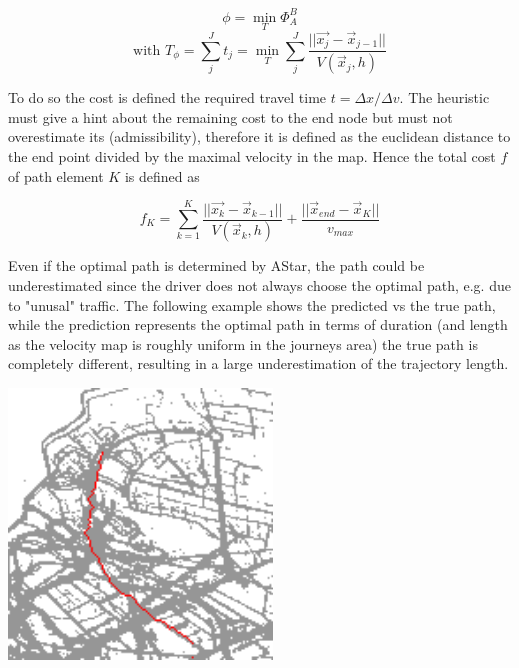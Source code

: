 \documentclass{article}
\newenvironment{Figure}
{\par\medskip\noindent\minipage{\linewidth}}
{\endminipage\par\medskip}
\begin{document}
\begin{multicols}{2}
$$\phi = \min_{T} \Phi_A^B$$
$$\text{with } T_{\phi} = \sum_j^J t_j = \min_{T} \sum_j^J \frac{||\vec{x_j} - \vec{x}_{j-1}||}{V(\vec{x}_j, h)}$$

To do so the cost is defined the required travel time $t = \Delta x / \Delta v$. The heuristic must give a hint about the remaining cost to the end node but must not overestimate its (admissibility), therefore it is defined as the euclidean distance to the end point divided by the maximal velocity in the map. Hence the total cost $f$ of path element $K$ is defined as 

$$f_K = \sum_{k=1}^K \frac{||\vec{x_k} - \vec{x}_{k-1}||}{V(\vec{x}_k, h)} + \frac{||\vec{x}_{end} - \vec{x}_{K}||}{v_{max}}$$

Even if the optimal path is determined by AStar, the path could be underestimated since the driver does not always choose the optimal path, e.g. due to "unusal" traffic. The following example shows the predicted vs the true path, while the prediction represents the optimal path in terms of duration (and length as the velocity map is roughly uniform in the journeys area) the true path is completely different, resulting in a large underestimation of the trajectory length. 

\begin{Figure}
\begin{center}
\includegraphics[width=7cm]{shortening_pred.png}
\end{center}
\label{fig:short_pred}
\end{Figure}


\end{multicols}
\end{document}
